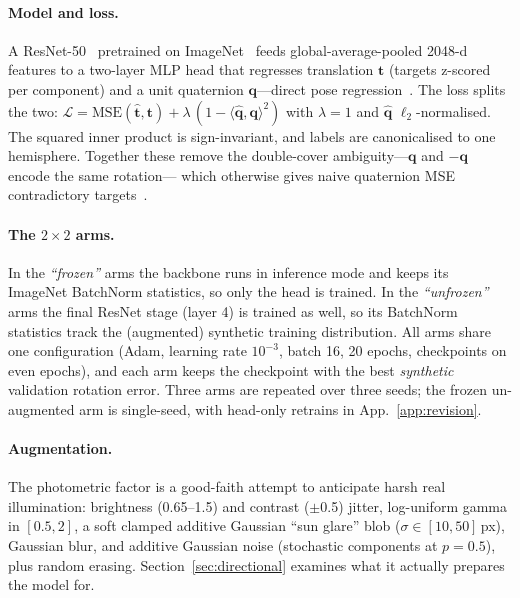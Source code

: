\documentclass{article}
\begin{document}
\paragraph{Model and loss.} A ResNet-50~\citep{he2016resnet} pretrained on
ImageNet~\citep{deng2009imagenet} feeds global-average-pooled 2048-d features
to a two-layer MLP head that regresses translation $\mathbf{t}$ (targets
z-scored per component) and a unit quaternion $\mathbf{q}$---direct pose
regression~\citep{kendall2015posenet,sharma2020spn,proenca2020urso}.
The loss splits the two: $\mathcal{L} = \mathrm{MSE}(\hat{\mathbf{t}},
\mathbf{t}) + \lambda\,(1 - \langle\hat{\mathbf{q}},\mathbf{q}\rangle^{2})$
with $\lambda{=}1$ and $\hat{\mathbf{q}}$ $\ell_2$-normalised. The squared inner product
is sign-invariant, and labels are canonicalised to one hemisphere. Together these remove
the double-cover ambiguity---$\mathbf{q}$ and $-\mathbf{q}$ encode the same rotation---
which otherwise gives naive quaternion MSE contradictory
targets~\citep{zhou2019continuity}.

\paragraph{The $2{\times}2$ arms.} In the \emph{``frozen''} arms the backbone runs in
inference mode and keeps its ImageNet BatchNorm statistics, so only the head is trained.
In the \emph{``unfrozen''} arms the final ResNet stage (layer 4) is trained as well, so
its BatchNorm statistics track the (augmented) synthetic training distribution. All arms
share one configuration (Adam, learning rate $10^{-3}$, batch 16, 20 epochs, checkpoints
on even epochs), and each arm keeps the checkpoint with the best \emph{synthetic}
validation rotation error. Three arms are repeated over three seeds; the frozen
un-augmented arm is single-seed, with head-only retrains in App.~\ref{app:revision}.

\paragraph{Augmentation.} The photometric factor is a good-faith attempt to anticipate
harsh real illumination: brightness (0.65--1.5) and contrast
($\pm$0.5) jitter, log-uniform gamma in $[0.5,2]$, a soft clamped additive
Gaussian ``sun glare'' blob ($\sigma \in [10,50]$\,px), Gaussian blur, and
additive Gaussian noise (stochastic components at $p{=}0.5$), plus random
erasing. Section~\ref{sec:directional} examines what it actually prepares the model for.
\end{document}
